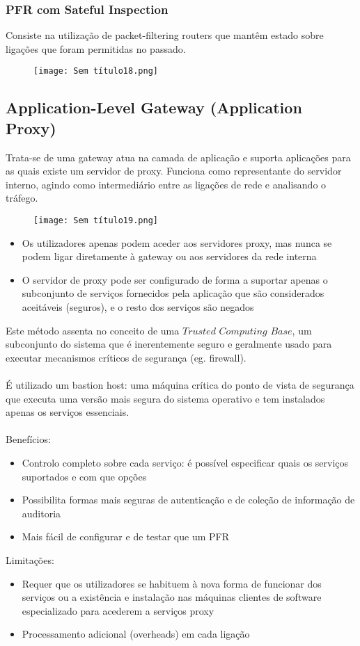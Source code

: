 \documentclass[10pt,a4paper]{report}
\begin{document}
\subsubsection{PFR com Sateful Inspection}
Consiste na utilização de packet-filtering routers que mantêm estado sobre ligações que foram permitidas no passado.
\begin{figure}[H]
\centering
\texttt{[image: Sem título18.png]}
\end{figure}
\subsection{Application-Level Gateway (Application Proxy)}
Trata-se de uma gateway atua na camada de aplicação e suporta aplicações para as quais existe um servidor de proxy. Funciona como representante do servidor interno, agindo como intermediário entre as ligações de rede e analisando o tráfego.
\begin{figure}[H]
\centering
\texttt{[image: Sem título19.png]}
\end{figure}
\begin{itemize}
\item Os utilizadores apenas podem aceder aos servidores proxy, mas nunca se podem ligar diretamente à gateway ou aos servidores da rede interna
\item O servidor de proxy pode ser configurado de forma a suportar apenas o subconjunto de serviços fornecidos pela aplicação que são considerados aceitáveis (seguros), e o resto dos serviços são negados
\end{itemize}
Este método assenta no conceito de uma $Trusted$ $Computing$ $Base$, um subconjunto do sistema que é inerentemente seguro e geralmente usado para executar mecanismos críticos de segurança (eg. firewall).\\
\\
É utilizado um bastion host: uma máquina crítica do ponto de vista de segurança que executa uma versão mais segura do sistema operativo e tem instalados apenas os serviços essenciais.\\
\\
Benefícios:
\begin{itemize}
\item Controlo completo sobre cada serviço: é possível especificar quais os
serviços suportados e com que opções
\item Possibilita formas mais seguras de autenticação e de coleção de
informação de auditoria
\item Mais fácil de configurar e de testar que um PFR
\end{itemize}
Limitações:
\begin{itemize}
\item Requer que os utilizadores se habituem à nova forma de funcionar dos
serviços ou a existência e instalação nas máquinas clientes de software
especializado para acederem a serviços proxy
\item Processamento adicional (overheads) em cada ligação
\end{itemize}
\end{document}
